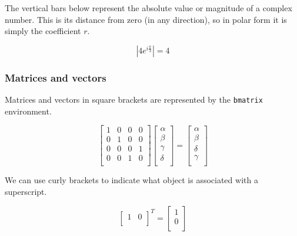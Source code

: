 \documentclass{article}
\begin{document}
The vertical bars below represent the absolute value or magnitude of a complex number. This is its distance from zero (in any direction), so in polar form it is simply the coefficient $r$.

\begin{equation*}
   |4e^{i\frac{\pi}{3}}| = 4
\end{equation*}

\subsubsection*{Matrices and vectors}

Matrices and vectors in square brackets are represented by the \texttt{bmatrix} environment.

\begin{equation*}
\begin{bmatrix}
    1 & 0 & 0 & 0 \\
    0 & 1 & 0 & 0 \\
    0 & 0 & 0 & 1 \\
    0 & 0 & 1 & 0 \\
\end{bmatrix}
\begin{bmatrix}
    \alpha  \\
    \beta  \\
    \gamma  \\
    \delta  \\
\end{bmatrix}
=
\begin{bmatrix}
    \alpha  \\
    \beta  \\
    \delta  \\
    \gamma  \\
\end{bmatrix}
\end{equation*}

We can use curly brackets to indicate what object is associated with a superscript.

\begin{equation*}
{\begin{bmatrix}
    1 & 0 \\
\end{bmatrix}}^{T}
=
\begin{bmatrix}
    1 \\
    0 \\
\end{bmatrix}
\end{equation*}
\end{document}
